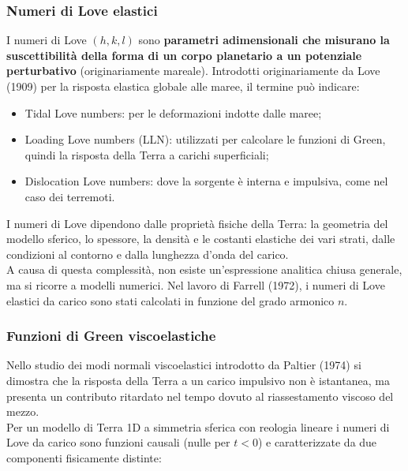 \documentclass[a4paper,12pt]{book}
\begin{document}
\subsubsection{\textcolor{colore7}{Numeri di Love elastici}}

I numeri di Love $(h, k, l)$ sono \textbf{parametri adimensionali che misurano la suscettibilità della forma di un corpo planetario a un potenziale perturbativo} (originariamente mareale).
Introdotti originariamente da Love (1909) per la risposta elastica globale alle maree, il termine può indicare:

\begin{itemize}
    \item Tidal Love numbers: per le deformazioni indotte dalle maree;
    \item Loading Love numbers (LLN): utilizzati per calcolare le funzioni di Green, quindi la risposta della Terra a carichi superficiali;
    \item Dislocation Love numbers: dove la sorgente è interna e impulsiva, come nel caso dei terremoti.
\end{itemize}

\noindent
I numeri di Love dipendono dalle proprietà fisiche della Terra: la geometria del modello sferico, lo spessore, la densità e le costanti elastiche dei vari strati,
dalle condizioni al contorno e dalla lunghezza d'onda del carico.\\

\noindent
A causa di questa complessità, non esiste un'espressione analitica chiusa generale, ma si ricorre a modelli numerici.
Nel lavoro di Farrell (1972), i numeri di Love elastici da carico sono stati calcolati in funzione del grado armonico $n$.\\

\subsubsection{\textcolor{colore7}{Funzioni di Green viscoelastiche}}

Nello studio dei modi normali viscoelastici introdotto da Paltier (1974) si dimostra che la risposta della Terra a un carico impulsivo non è istantanea,
ma presenta un contributo ritardato nel tempo dovuto al riassestamento viscoso del mezzo.\\

\noindent
Per un modello di Terra 1D a simmetria sferica con reologia lineare i numeri di Love da carico sono funzioni causali (nulle per $t < 0$) e caratterizzate da due componenti fisicamente distinte:
\end{document}
